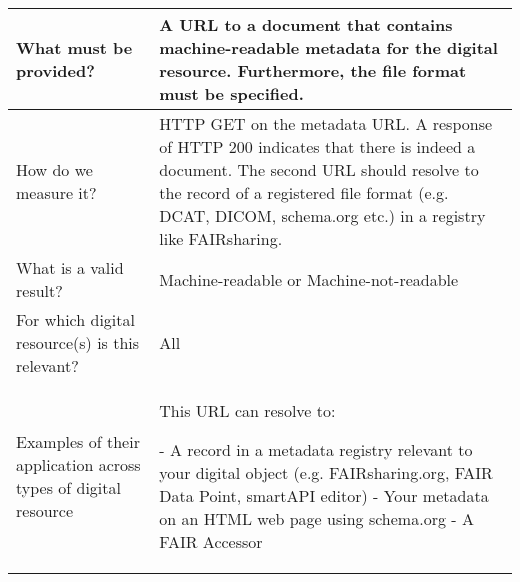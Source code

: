 \documentclass[english]{article}
\begin{document}
\begin{longtable}{|p{5cm}|p{9cm}|}
\hline
What must be provided? &  

A URL to a document that contains machine-readable metadata for the digital resource. Furthermore, the file format must be specified.

 \\



\hline
How do we measure it? &  
HTTP GET on the metadata URL. A response of HTTP 200 indicates that there is indeed a document. The second URL should resolve to the record of a registered file format (e.g. DCAT, DICOM, schema.org etc.) in a registry like FAIRsharing. \newline
\\



\hline
What is a valid result? &  

Machine-readable or Machine-not-readable

\\



\hline
For which digital resource(s) is this relevant? &  All\\



\hline
Examples of their application across types of digital resource &  
This URL can resolve to:\newline

- A record in a metadata registry relevant to your digital object (e.g. FAIRsharing.org, FAIR Data Point, smartAPI editor)\newline
- Your metadata on an HTML web page using schema.org\newline
- A FAIR Accessor\newline


\end{longtable}
\end{document}
